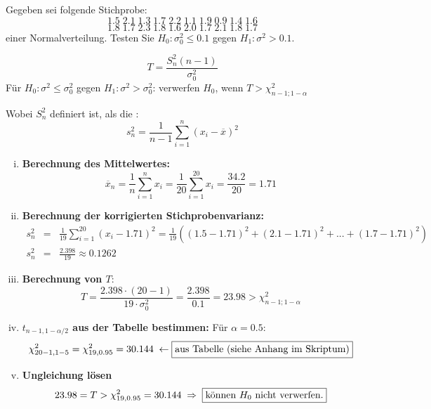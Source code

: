 \begin{uebsp}
\begin{Exercise}[label=ex:9.3]
Gegeben sei folgende Stichprobe:
\[1.5\;2.1\;1.3\;1.7\;2.2\;1.1\;1.9\;0.9\;1.4\;1.6\]
\[1.8\;1.7\;2.3\;1.8\;1.6\;2.0\;1.7\;2.1\;1.8\;1.7\]
einer Normalverteilung. Testen Sie $H_0:\sigma_0^2\leq 0.1$ gegen $H_1:\sigma^2>0.1$.
\end{Exercise}
\begin{Answer}
\begin{uebsp_theory}
\[T=\frac{S_n^2(n-1)}{\sigma_0^2}\]
Für $H_0:\sigma^2 \leq\sigma_0^2$ gegen $H_1:\sigma^2>\sigma_0^2$:
    verwerfen $H_0$, wenn $T>\chi^2_{n-1;1-\alpha}$

Wobei $S_n^2$ definiert ist, als die :
\[s_n^2=\frac{1}{n-1}\sum_{i=1}^n(x_i-\overline x)^2\]
\end{uebsp_theory}
\begin{enumerate}[i)]
\item \textbf{Berechnung des Mittelwertes:}
\[\overline x_n=\frac{1}{n}\sum_{i=1}^nx_i=\frac{1}{20}\sum_{i=1}^{20}x_i=\frac{34.2}{20}=1.71\]
\item \textbf{Berechnung der korrigierten Stichprobenvarianz:}
\begin{eqnarray*}
s_n^2&=&\frac{1}{19}\sum_{i=1}^{20}(x_i-1.71)^2=\frac{1}{19}((1.5-1.71)^2+(2.1-1.71)^2+...+(1.7-1.71)^2)\\
s_n^2&=&\frac{2.398}{19}\approx0.1262
\end{eqnarray*}
\item \textbf{Berechnung von $T:$}
\[T=\frac{2.398\cdot(20-1)}{19\cdot \sigma_0^2}=\frac{2.398}{0.1}=23.98>\chi^2_{n-1;1-\alpha}\]
\item \textbf{$t_{n-1,1-\alpha/2}$ aus der Tabelle bestimmen:}
Für  $\alpha=0.5$:
\[\chi^2_{20-1,1-5}=\chi^2_{19,0.95}=30.144\;\leftarrow\framebox{aus \reference{Tabelle}{Anhang}{sec:quantile_chi_verteilung}}\]
\item \textbf{Ungleichung lösen}
\[23.98=T>\chi^2_{19,0.95}=30.144\;\Rightarrow\;\framebox{können $H_0$ nicht verwerfen.}\]
\end{enumerate}
\end{Answer}
\end{uebsp}
